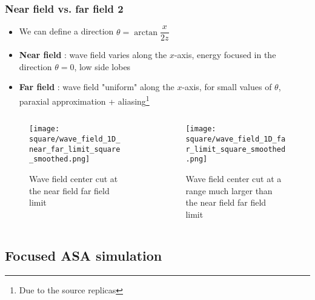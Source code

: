 \documentclass[UKenglish,8pt,aspectratio=1610]{beamer}
\begin{document}
\begin{frame}
		\frametitle{Near field vs. far field 2}
		
		\begin{itemize}
			\item We can define a direction $\theta=\arctan\dfrac{x}{2z}$
			\item \textbf{Near field} : wave field varies along the $x$-axis, energy focused in the direction $\theta=0$, low side lobes 
			\item \textbf{Far field} : wave field "uniform" along the $x$-axis, for small values of $\theta$, paraxial approximation + aliasing\footnote{Due to the source replicas}
		\end{itemize}
			\begin{columns}
			\begin{column}{0.5\textwidth}
				
				\vspace{-15pt}
				\begin{figure}[h!]
					\texttt{[image: square/wave\_field\_1D\_near\_far\_limit\_square\_smoothed.png]}
					\centering
					\caption{Wave field center cut at the near field far field limit}
				\end{figure}
			\end{column}
			\begin{column}{0.5\textwidth}
				\vspace{-15pt}
				\begin{figure}[h!]
					\texttt{[image: square/wave\_field\_1D\_far\_limit\_square\_smoothed.png]}
					\centering
					\caption{Wave field center cut at a range much larger than the near field far field limit}
				\end{figure}
				
			\end{column}
		\end{columns}
	
\end{frame}

	\subsection{Focused ASA simulation}
	
\end{document}
